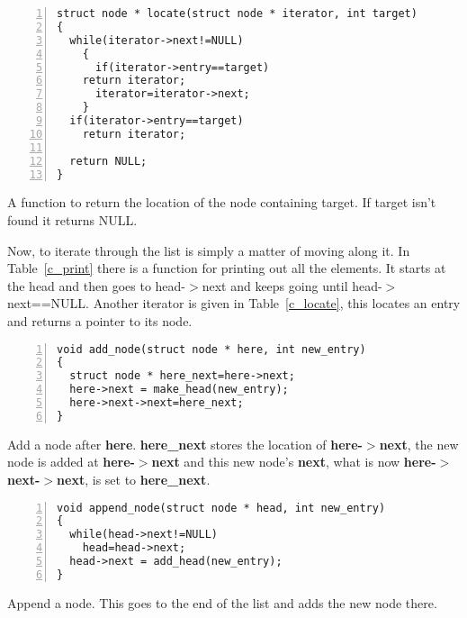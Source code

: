 \documentclass[11pt,a4paper]{scrartcl}
\newcommand{\pter}{-$>$}
\begin{document}
\begin{table}
\begin{lstlisting}[numbers=left]
struct node * locate(struct node * iterator, int target)
{
  while(iterator->next!=NULL)
    {
      if(iterator->entry==target)
	return iterator;
      iterator=iterator->next;
    }
  if(iterator->entry==target)
    return iterator;

  return NULL;
}
\end{lstlisting}
\caption{A function to return the location of the node containing target. If target isn't found it returns NULL.\label{c_locate}}
\end{table}


Now, to iterate through the list is simply a matter of moving along
it. In Table~\ref{c_print} there is a function for printing out all
the elements. It starts at the head and then goes to head-$>$next and
keeps going until head-$>$next==NULL. Another iterator is given in
Table~\ref{c_locate}, this locates an entry and returns a pointer to
its node.


\begin{table}
\begin{lstlisting}[numbers=left]
void add_node(struct node * here, int new_entry)
{
  struct node * here_next=here->next;
  here->next = make_head(new_entry);
  here->next->next=here_next;
}
\end{lstlisting}
\caption{Add a node after
  \textbf{here}. \textbf{here\_next} stores the
  location of \textbf{here\pter next}, the new node is added at
  \textbf{here\pter next} and this new node's \textbf{next}, what is now
  \textbf{here\pter next\pter next}, is set to
  \textbf{here\_next}.\label{c_add}}
\end{table}

\begin{table}
\begin{lstlisting}[numbers=left]
void append_node(struct node * head, int new_entry)
{
  while(head->next!=NULL)
    head=head->next;
  head->next = add_head(new_entry);
}
\end{lstlisting}
\caption{Append a node. This goes to the end of the list and adds the
  new node there.\label{c_append}}
\end{table}
\end{document}
